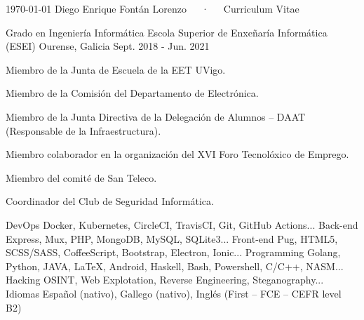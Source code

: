 \documentclass[11pt, a4paper]{style}
\begin{document}
\makecvheader
\makecvfooter
  {\today}
  {Diego Enrique Fontán Lorenzo~~~·~~~Curriculum Vitae}
  {\thepage}
\begin{cventries}
  \cventry
    {Grado en Ingeniería Informática} %
    {Escola Superior de Enxeñaría Informática (ESEI)} %
    {Ourense, Galicia} %
    {Sept. 2018 - Jun. 2021} %
    {
        \begin{cvitems} %
            \item {Miembro de la Junta de Escuela de la EET UVigo.}
            \item {Miembro de la Comisión del Departamento de Electrónica.}
            \item {Miembro de la Junta Directiva de la Delegación de Alumnos – DAAT (Responsable de la Infraestructura).}
            \item {Miembro colaborador en la organización del XVI Foro Tecnolóxico de Emprego.}
            \item {Miembro del comité de San Teleco.}
            \item {Coordinador del Club de Seguridad Informática.}
      \end{cvitems}
    }
\end{cventries}
\begin{cvskills}
  \cvskill
    {DevOps} %
    {Docker, Kubernetes, CircleCI, TravisCI, Git, GitHub Actions...} %
  \cvskill
    {Back-end} %
    {Express, Mux, PHP, MongoDB, MySQL, SQLite3...} %
  \cvskill
    {Front-end} %
    {Pug, HTML5, SCSS/SASS, CoffeeScript, Bootstrap, Electron, Ionic...} %
  \cvskill
    {Programming} %
    {Golang, Python, JAVA, \LaTeX, Android, Haskell, Bash, Powershell, C/C++, NASM...} %
  \cvskill
    {Hacking} %
    {OSINT, Web Explotation, Reverse Engineering, Steganography...} %
  \cvskill
    {Idiomas} %
    {Español (nativo), Gallego (nativo), Inglés (First – FCE – CEFR level B2)} %
\end{cvskills}
\end{document}
